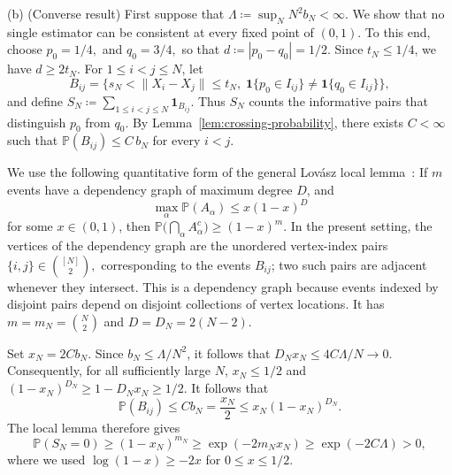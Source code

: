 \documentclass[ECP,preprint]{ejpecp} %
\newcommand{\1}{\mathbf 1}
\newcommand{\PP}{\mathbb P}
\begin{document}
\bigskip 
\noindent (b) (Converse result) First suppose that
\(
    \Lambda
    \coloneqq
    \sup_N N^2b_N
    <\infty.
\)
We show that no single estimator can be consistent at every fixed
point of \((0,1)\). To this end, choose
\(
    p_0= 1/4,
\)
and
\(
    q_0= 3/4,
\)
so that
\(
    d \coloneqq |p_0-q_0|= 1/2.
\)
Since \(t_N\le1/4\), we have \(d\ge2t_N\).
%
For \(1\le i<j\le N\), let
\[
    B_{ij}
    =
    \Big\{
        s_N<\|X_i-X_j\|\le t_N,\;
        \1\{p_0\in I_{ij}\}\ne\1\{q_0\in I_{ij}\}
    \Big\},
\]
and define
\(
    S_N
    \coloneqq
    \sum_{1\le i<j\le N}\1_{B_{ij}}.
\)
Thus \(S_N\) counts the informative pairs that distinguish \(p_0\) from \(q_0\). By Lemma~\ref{lem:crossing-probability}, there exists \(C<\infty\) such that
\(
    \PP(B_{ij})\le C \, b_N
\)
for every \(i<j\).

We use the following quantitative form of the general Lov\'asz local
lemma~\cite[Lemma~5.1.1]{alon2016probabilistic}: If \(m\) events have a dependency graph of maximum degree \(D\), and
\[
    \max_\alpha\PP(A_\alpha)
    \le x(1-x)^D
\]
for some \(x\in(0,1)\), then
\(
    \PP \Big(\bigcap_\alpha A_\alpha^c \Big)
    \ge (1-x)^m.
\)
In the present setting, the vertices of the dependency graph are the
unordered vertex-index pairs
\(
    \{i,j\}\in\binom{[N]}2,
\)
corresponding to the events \(B_{ij}\); two such pairs are adjacent whenever they intersect.  This is a dependency graph because events indexed by disjoint
pairs depend on disjoint collections of vertex locations. It has
\(
    m=m_N=\binom N2
\)
and
\(
    D=D_N=2(N-2).
\)

Set
\(
    x_N=2Cb_N.
\)
Since \(b_N\le\Lambda/N^2\), it follows that
\(
    D_N x_N
    \le
    {4C\Lambda}/{N}
    \to 0.
\)
Consequently, for all sufficiently large \(N\), \(x_N\le1/2\) and
\(
    (1-x_N)^{D_N}
    \ge
    1-D_Nx_N
    \ge
    1/2.
\)
It follows that
\[
    \PP(B_{ij})
    \le
    Cb_N
    =
    \frac{x_N}{2}
    \le
    x_N(1-x_N)^{D_N}.
\]
The local lemma therefore gives
\[
    \PP(S_N=0)
    \ge
    (1-x_N)^{m_N} 
    \ge
    \exp(-2m_Nx_N) 
    \ge
    \exp(-2C\Lambda)
    >0,
\]
where we used \(\log(1-x)\ge-2x\) for \(0\le x\le1/2\).
\end{document}
